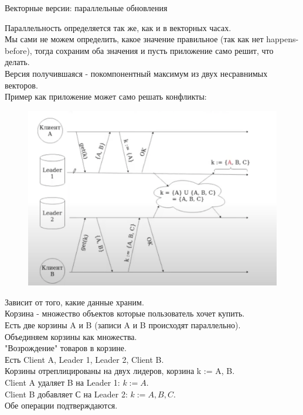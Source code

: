 \begin{definition}
  Векторные версии: параллельные обновления
\end{definition}
Параллельность определяется так же, как и в векторных часах. \\
Мы сами не можем определить, какое значение правильное (так как нет happens-before), тогда сохраним оба значения и пусть приложение само решит, что делать. \\
Версия получившаяся - покомпонентный максимум из двух несравнимых векторов. \\
Пример как приложение может само решать конфликты:\\
\begin{figure}[h]
    \centering
    \includegraphics[scale = 0.5]{../assets/4.png}
    \caption{}
\end{figure}
Зависит от того, какие данные храним.\\
Корзина - множество объектов которые пользователь хочет купить.\\
Есть две корзины A и B (записи A и B происходят параллельно).\\
Объединяем корзины как множества.\\
"Возрождение" товаров в корзине.\\
Есть Client A, Leader 1, Leader 2, Client B.\\
Корзины отреплицированы на двух лидеров, корзина k := {A, B}.\\
Client A удаляет B на Leader 1: $k := {A}$.\\
Client B добавляет С на Leader 2: $k := {A, B, C}$.\\
Обе операции подтверждаются.\\
